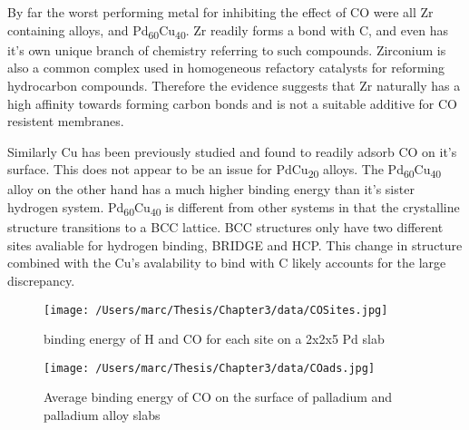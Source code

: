 By far the worst performing metal for inhibiting the effect of CO were all Zr containing alloys, and Pd\textsubscript{60}Cu\textsubscript{40}. Zr readily forms a bond with C, and even has it's own unique branch of chemistry referring to such compounds.\cite{doi:10.1021/cen-v082n016.p036} Zirconium is also a common complex used in homogeneous refactory catalysts for reforming hydrocarbon compounds.\cite{doi:10.1002/9780470504437.ch1} Therefore the evidence suggests that Zr naturally has a high affinity towards forming carbon bonds and is not a suitable additive for CO resistent membranes. 

Similarly Cu has been previously studied and found to readily adsorb CO on it's surface. \cite{doi:10.1021/la950167j} This does not appear to be an issue for PdCu\textsubscript{20} alloys. The Pd\textsubscript{60}Cu\textsubscript{40} alloy on the other hand has a much higher binding energy than it's sister hydrogen system. Pd\textsubscript{60}Cu\textsubscript{40} is different from other systems in that the crystalline structure transitions to a BCC lattice. \cite{She2014} BCC structures only have two different sites avaliable for hydrogen binding, BRIDGE and HCP. \cite{C3CP44367A} This change in structure combined with the Cu's avalability to bind with C likely accounts for the large discrepancy. 

\begin{figure}
  \centering
  \texttt{[image: /Users/marc/Thesis/Chapter3/data/COSites.jpg]}
  \caption{binding energy of H and CO for each site on a 2x2x5 Pd slab}
  \label{COsite}
\end{figure}


\begin{landscape}
    \begin{figure}
        \centering
        \texttt{[image: /Users/marc/Thesis/Chapter3/data/COads.jpg]}
        \caption{Average binding energy of CO on the surface of palladium and palladium alloy slabs}
        \label{coads}
      \end{figure}
    
    \end{landscape}
